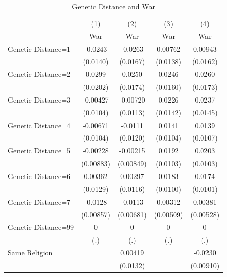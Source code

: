 \documentclass{article}
\begin{document}
\begin{table}[htbp]\centering
\caption{Genetic Distance and War \label{tab:Blood}}
\begin{tabular}{l*{4}{c}}
\toprule
                    &\multicolumn{1}{c}{(1)}&\multicolumn{1}{c}{(2)}&\multicolumn{1}{c}{(3)}&\multicolumn{1}{c}{(4)}\\
                    &\multicolumn{1}{c}{War}&\multicolumn{1}{c}{War}&\multicolumn{1}{c}{War}&\multicolumn{1}{c}{War}\\
\midrule
Genetic Distance=1  &     -0.0243&     -0.0263&     0.00762&     0.00943\\
                    &    (0.0140)&    (0.0167)&    (0.0138)&    (0.0162)\\
\addlinespace
Genetic Distance=2  &      0.0299&      0.0250&      0.0246&      0.0260\\
                    &    (0.0202)&    (0.0174)&    (0.0160)&    (0.0173)\\
\addlinespace
Genetic Distance=3  &    -0.00427&    -0.00720&      0.0226&      0.0237\\
                    &    (0.0104)&    (0.0113)&    (0.0142)&    (0.0145)\\
\addlinespace
Genetic Distance=4  &    -0.00671&     -0.0111&      0.0141&      0.0139\\
                    &    (0.0104)&    (0.0120)&    (0.0104)&    (0.0107)\\
\addlinespace
Genetic Distance=5  &    -0.00228&    -0.00215&      0.0192&      0.0203\\
                    &   (0.00883)&   (0.00849)&    (0.0103)&    (0.0103)\\
\addlinespace
Genetic Distance=6  &     0.00362&     0.00297&      0.0183&      0.0174\\
                    &    (0.0129)&    (0.0116)&    (0.0100)&    (0.0101)\\
\addlinespace
Genetic Distance=7  &     -0.0128&     -0.0113&     0.00312&     0.00381\\
                    &   (0.00857)&   (0.00681)&   (0.00509)&   (0.00528)\\
\addlinespace
Genetic Distance=99 &           0&           0&           0&           0\\
                    &         (.)&         (.)&         (.)&         (.)\\
\addlinespace
Same Religion       &            &     0.00419&            &     -0.0230\\
                    &            &    (0.0132)&            &   (0.00910)\\

\end{tabular}
\end{table}
\end{document}
